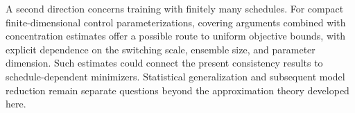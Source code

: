 \documentclass[twoside,11pt]{article}
\theoremstyle{plain}
\newtheorem{remark}[theorem]{Remark}
\begin{document}
A second direction concerns training with finitely many schedules.
For compact finite-dimensional control parameterizations, covering
arguments combined with concentration estimates offer a possible route
to uniform objective bounds, with explicit dependence on the switching
scale, ensemble size, and parameter dimension. Such estimates could
connect the present consistency results to schedule-dependent
minimizers. Statistical generalization and subsequent model reduction
remain separate questions beyond the approximation theory developed here.



    

 
\end{document}
